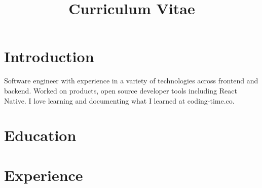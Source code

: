 \documentclass[11pt,a4paper,sans]{moderncv} %
\title{Curriculum Vitae}
\begin{document}

\makecvtitle %


\section{Introduction}

Software engineer with experience in a variety of technologies across frontend and backend. Worked on products, open source developer tools including React Native. I love learning and documenting what I learned at coding-time.co.


\section{Education}



\section{Experience}


\end{document}
